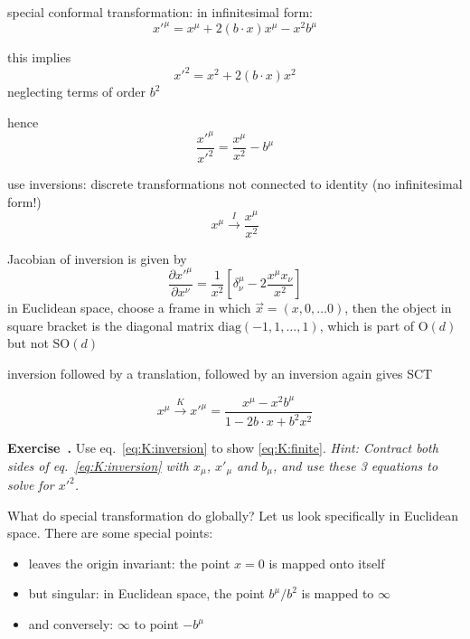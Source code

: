 \documentclass[a4paper,12pt]{article}
\numberwithin{equation}{section}
\newcounter{exercise}[section]
\newenvironment{exercise}[1][]%
	{\refstepcounter{exercise}\bigskip
	\begin{mdframed}[backgroundcolor=gray!20, linewidth=0]
	\noindent\textbf{Exercise~\thesection.\theexercise #1} \rmfamily}
  	{\end{mdframed}\bigskip}
\newcommand\hint[1]{\emph{Hint: #1}}
\begin{document}
special conformal transformation:
in infinitesimal form:
\begin{equation}
	x'^\mu = x^\mu + 2 (b \cdot x) x^\mu - x^2 b^\mu
\end{equation}

this implies
\begin{equation}
	x'^2 = x^2 + 2 (b \cdot x) x^2
\end{equation}
neglecting terms of order $b^2$

hence
\begin{equation}
	\frac{x'^\mu}{x'^2}
	= \frac{x^\mu}{x^2} - b^\mu
	\label{eq:K:inversion}
\end{equation}


use inversions: discrete transformations not connected to identity
(no infinitesimal form!)
\begin{equation}
	x^\mu \xrightarrow{I} \frac{x^\mu}{x^2}
\end{equation}

Jacobian of inversion is given by
\begin{equation}
	\frac{\partial x'^\mu}{\partial x^\nu}
	= \frac{1}{x^2}
	\left[ \delta^\mu_\nu - 2 \frac{x^\mu x_\nu}{x^2} \right]
\end{equation}
in Euclidean space, choose a frame in which $\vec{x} = (x, 0, \ldots 0)$, then the object in square bracket is the diagonal matrix $\text{diag}(-1, 1, \ldots, 1)$, which is part of $\text{O}(d)$ but not $\text{SO}(d)$


inversion followed by a translation, followed by an inversion again gives SCT


\begin{equation}
	x^\mu \xrightarrow{K}
	x'^\mu = \frac{x^\mu - x^2 b^\mu}
	{1 - 2 b \cdot x + b^2 x^2}
	\label{eq:K:finite}
\end{equation}

\begin{exercise}
	Use eq.~\eqref{eq:K:inversion} to show \eqref{eq:K:finite}.
		\hint{Contract both sides of eq.~\eqref{eq:K:inversion} with $x_\mu$, $x'_\mu$ and $b_\mu$, and use these 3 equations to solve for $x'^2$.}
\end{exercise}




What do special transformation do globally?
Let us look specifically in Euclidean space. There are some special points:
\begin{itemize}


\item
leaves the origin invariant: the point $x = 0$ is mapped onto itself

\item
but singular: in Euclidean space, the point $b^\mu / b^2$ is mapped to $\infty$

\item
and conversely: $\infty$ to point $-b^\mu$

\end{itemize}
\end{document}
